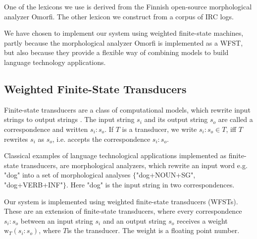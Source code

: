 \documentclass[a4paper,conference]{IEEEtran}
\begin{document}
One of the lexicons we use is derived from the Finnish open-source
morphological analyzer Omorfi. The other lexicon we construct from a
corpus of IRC logs.

We have chosen to implement our system using weighted finite-state
machines, partly because the morphological analyzer Omorfi is
implemented as a WFST, but also because they provide a flexible way of
combining models to build language technology applications.

\subsection{Weighted Finite-State Transducers}


Finite-state transducers are a class of computational models, which
rewrite input strings to output strings \cite{beesley/2003}. The input
string $s_i$ and its output string $s_o$ are called a correspondence
and written $s_i\mathrm{:}s_o$. If $T$ is a transducer, we write
$s_i\mathrm{:}s_o \in T$, iff $T$ rewrites $s_i$ as $s_o$, i.e. accepts the correspondence $s_i\mathrm{:}s_o$.

Classical examples of language technological applications
implemented as finite-state transducers, are morphological analyzers,
which rewrite an input word e.g. "dog" into a set of morphological
analyses $\{$"dog+NOUN+SG", "dog+VERB+INF"$\}$. Here "dog" is the
input string in two correspondences.

Our system is implemented using weighted finite-state transducers
(WFSTs). These are an extension of finite-state transducers, where
every correspondence $s_i\mathrm{:}s_o$ between an input string $s_i$
and an output string $s_o$ receives a weight $\mathrm{w}_T(s_i\mathrm{:}s_o)$,
where $T$is the transducer. The weight is a floating point number. 
\end{document}
